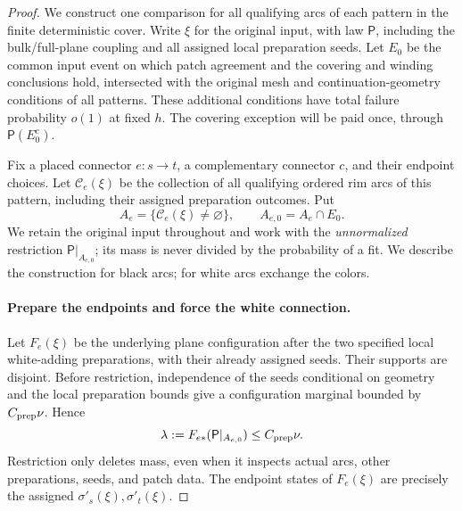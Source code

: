 \begin{proof}
We construct one comparison for all qualifying arcs of each pattern
in the finite deterministic cover.  Write $\xi$ for the original input,
with law $\mathsf P$, including the bulk/full-plane coupling and all
assigned local preparation seeds.  Let $E_0$ be the common input event
on which patch agreement and the covering and winding conclusions hold,
intersected with
the original mesh and continuation-geometry conditions of all patterns.
These additional conditions have total failure probability $o(1)$ at
fixed $h$.  The covering exception will be paid once, through
$\mathsf P(E_0^c)$.

Fix a placed connector $e:s\to t$, a complementary connector $c$, and
their endpoint choices.  Let $\mathscr C_e(\xi)$ be the collection of
all qualifying ordered rim arcs of this pattern, including their assigned
preparation outcomes.  Put
\[
 A_e=\{\mathscr C_e(\xi)\ne\varnothing\},\qquad A_{e,0}=A_e\cap E_0.
\]
We retain the original input throughout and work with the
\emph{unnormalized} restriction $\mathsf P|_{A_{e,0}}$; its mass is
never divided by the probability of a fit.  We describe the construction
for black arcs; for white arcs exchange the colors.

\paragraph{Prepare the endpoints and force the white connection.}
Let $F_e(\xi)$ be the underlying plane configuration after the two
specified local white-adding preparations, with their already assigned
seeds.  Their supports are disjoint.  Before restriction, independence
of the seeds conditional on geometry and the local preparation bounds
give a configuration marginal bounded by $C_{\rm prep}\nu$.  Hence
\[
 \lambda:=F_{e*}(\mathsf P|_{A_{e,0}})\le C_{\rm prep}\nu.
\]
Restriction only deletes mass, even when it inspects actual arcs,
other preparations, seeds, and patch data.  The endpoint states of
$F_e(\xi)$ are precisely the assigned $\sigma'_s(\xi),\sigma'_t(\xi)$.


\end{proof}
